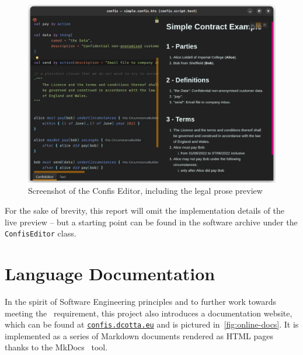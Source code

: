 \begin{figure}[h]
    \centering
    \includegraphics[width=\textwidth]{figures/simple.confis.editor}
    \caption{Screenshot of the Confis Editor, including the legal prose preview}
    \label{fig:confis.minimal.editor}
\end{figure}



For the sake of brevity, this report will omit the implementation details of the live preview -- but a starting point can be found in the software archive under the \texttt{ConfisEditor} class.

\section{Language Documentation}\label{sec:language-documentation}

In the spirit of Software Engineering principles and to further work towards meeting the~ requirement, this project also introduces a documentation website, which can be found at \href{https://confis.dcotta.eu}{\texttt{confis.dcotta.eu}} and is pictured in~\autoref{fig:online-docs}.
It is implemented as a series of Markdown documents rendered as HTML pages thanks to the MkDocs~\cite{mkDocs} tool.

